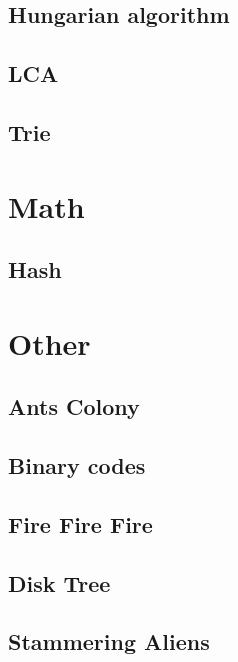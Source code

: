         \subsection{Hungarian algorithm}
                
        \subsection{LCA}
                
        \subsection{Trie}
                

\section{Math}
        \subsection{Hash}
                

\section{Other}
        \subsection{Ants Colony}
                
        \subsection{Binary codes}        
                
        \subsection{Fire Fire Fire}        
                
        \subsection{Disk Tree}        
                
        \subsection{Stammering Aliens}        
                

